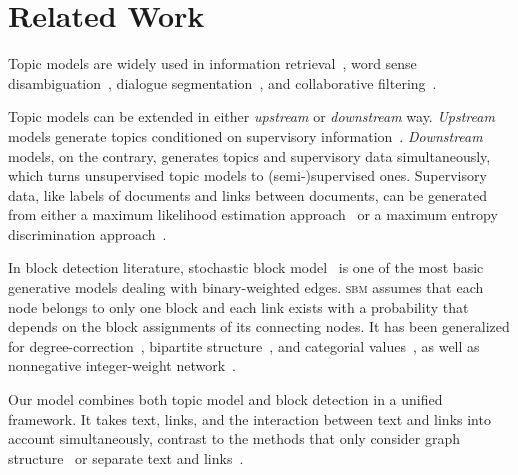 \section{Related Work}
\label{sec:related_work}

Topic models are widely used in information retrieval~\cite{wei-2006-lda-ir},
word sense disambiguation~\cite{boyd-graber-2007-tm-wsd}, dialogue
segmentation~\cite{purver-2006-dialog-seg}, and collaborative
filtering~\cite{marlin-2003-tm-cf}.

Topic models can be extended in either \emph{upstream} or \emph{downstream} way.
\emph{Upstream} models generate topics conditioned on supervisory
information~\cite{daume-2009-mrtf,mimno-2012-dir-mult-reg,li-2005-tm-cv}.
\emph{Downstream} models, on the contrary, generates topics and supervisory data
simultaneously, which turns unsupervised topic models to (semi-)supervised ones.
Supervisory data, like labels of documents and links between documents, can be
generated from either a maximum likelihood estimation
approach~\cite{mcauliffe-2008-slda,chang-2010-rtm,boyd-graber-2010-mlslda} or a
maximum entropy discrimination
approach~\cite{zhu-2012-medlda,Yang:Boyd-Graber:Resnik-2015}.

In block detection literature, stochastic block
model~\cite[\textsc{sbm}]{holland-1983-sbm,wang-1987-sbm-directed} is one of the
most basic generative models dealing with binary-weighted edges.  \textsc{sbm}
assumes that each node belongs to only one block and each link exists with a
probability that depends on the block assignments of its connecting nodes.  It
has been generalized for
degree-correction~\cite{karrer-2011-sbm-degree-correction}, bipartite
structure~\cite{larremore-2014-sbm-bipartite}, and categorial
values~\cite{guimera-2013-sbm-categorical}, as well as nonnegative integer-weight
network~\cite[\wsbm]{aicher-2014-wsbm}.

Our model combines both topic model and block detection in a unified framework.
It takes text, links, and the interaction between text and links into account
simultaneously, contrast to the methods that only consider graph
structure~\cite{kim-2012-lmmg,liben-2007-link-pred} or separate text and
links~\cite{chaturvedi-2012-topical-graph-kernel}.